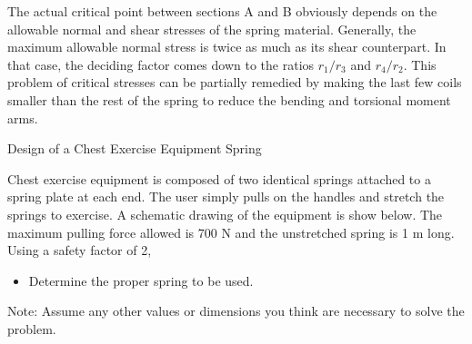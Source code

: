 \documentclass[
10pt,
a4paper,
openany,
svgnames,
]{book}
\begin{document}
The actual critical point between sections A and B obviously depends on the allowable normal and shear stresses of the spring material. Generally, the maximum allowable normal stress is twice as much as its shear counterpart. In that case, the deciding factor comes down to the ratios $r_1 / r_3$ and $r_4 / r_2$. 
This problem of critical stresses can be partially remedied by making the last few coils smaller than the rest of the spring to reduce the bending and torsional moment arms.

\begin{example} Design of a Chest Exercise Equipment Spring

  \begin{figure}[H]
    \centering
  \end{figure}

Chest exercise equipment is composed of two identical springs attached to a spring plate at each end. The user simply pulls on the handles and stretch the springs to exercise. A schematic drawing of the equipment is show below. The maximum pulling force allowed is 700 N and the unstretched spring is 1 m long. Using a safety factor of 2,

\begin{itemize}
\item Determine the proper spring to be used.
\end{itemize}
Note: Assume any other values or dimensions you think are necessary to solve the problem.
\end{example}
\end{document}
